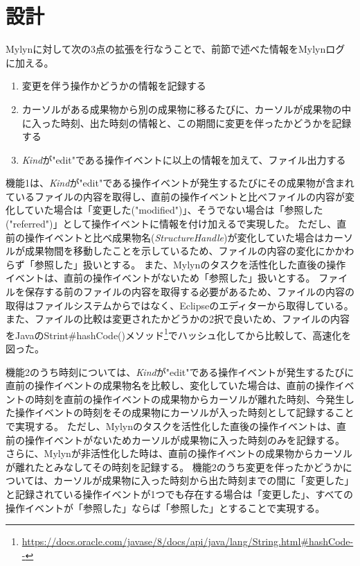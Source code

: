 \documentclass[a4paper]{jsbook}
\begin{document}
\section{設計}
Mylynに対して次の3点の拡張を行なうことで、前節で述べた情報をMylynログに加える。
\begin{enumerate}
  \item 変更を伴う操作かどうかの情報を記録する
  \item カーソルがある成果物から別の成果物に移るたびに、カーソルが成果物の中に入った時刻、出た時刻の情報と、この期間に変更を伴ったかどうかを記録する
  \item {\it Kind}が"edit"である操作イベントに以上の情報を加えて、ファイル出力する
\end{enumerate}
機能1は、{\it Kind}が"edit"である操作イベントが発生するたびにその成果物が含まれているファイルの内容を取得し、直前の操作イベントと比べファイルの内容が変化していた場合は「変更した("modified")」、そうでない場合は「参照した("referred")」として操作イベントに情報を付け加えるで実現した。
ただし、直前の操作イベントと比べ成果物名({\it StructureHandle})が変化していた場合はカーソルが成果物間を移動したことを示しているため、ファイルの内容の変化にかかわらず「参照した」扱いとする。
また、Mylynのタスクを活性化した直後の操作イベントは、直前の操作イベントがないため「参照した」扱いとする。
ファイルを保存する前のファイルの内容を取得する必要があるため、ファイルの内容の取得はファイルシステムからではなく、Eclipseのエディターから取得している。
また、ファイルの比較は変更されたかどうかの2択で良いため、ファイルの内容をJavaのStrint\#hashCode()メソッド\footnote{\url{https://docs.oracle.com/javase/8/docs/api/java/lang/String.html\#hashCode--}}でハッシュ化してから比較して、高速化を図った。

機能2のうち時刻については、{\it Kind}が"edit"である操作イベントが発生するたびに直前の操作イベントの成果物名を比較し、変化していた場合は、直前の操作イベントの時刻を直前の操作イベントの成果物からカーソルが離れた時刻、今発生した操作イベントの時刻をその成果物にカーソルが入った時刻として記録することで実現する。
ただし、Mylynのタスクを活性化した直後の操作イベントは、直前の操作イベントがないためカーソルが成果物に入った時刻のみを記録する。
さらに、Mylynが非活性化した時は、直前の操作イベントの成果物からカーソルが離れたとみなしてその時刻を記録する。
機能2のうち変更を伴ったかどうかについては、カーソルが成果物に入った時刻から出た時刻までの間に「変更した」と記録されている操作イベントが1つでも存在する場合は「変更した」、すべての操作イベントが「参照した」ならば「参照した」とすることで実現する。
\end{document}
